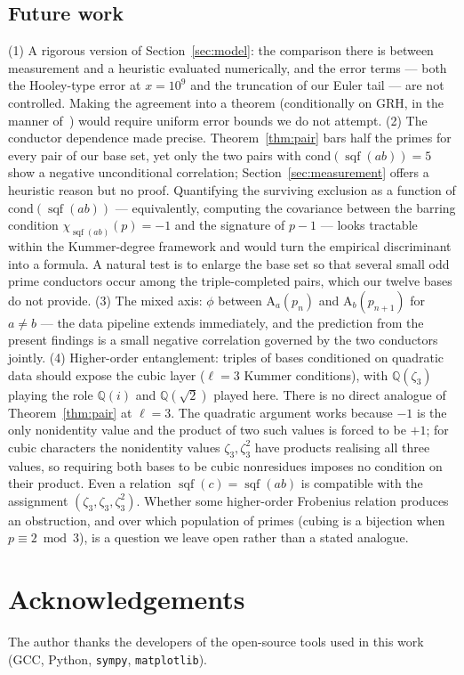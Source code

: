 \documentclass[11pt,reqno]{amsart}
\theoremstyle{plain}
\theoremstyle{definition}
\DeclareMathOperator{\sqf}{sqf}
\newcommand{\Art}{\mathrm{A}}
\newcommand{\Q}{\mathbb{Q}}
\begin{document}
\subsection*{Future work}
(1) A rigorous version of Section~\ref{sec:model}: the comparison there is
between measurement and a heuristic evaluated numerically, and the error terms
--- both the Hooley-type error at $x = 10^9$ and the truncation of our Euler
tail --- are not controlled. Making the agreement into a theorem (conditionally
on GRH, in the manner of~\cite{Matthews1976}) would require uniform error
bounds we do not attempt. (2) The conductor dependence made precise.
Theorem~\ref{thm:pair} bars half the primes for every pair of our base set,
yet only the two pairs with $\mathrm{cond}(\sqf(ab)) = 5$ show a negative
unconditional correlation; Section~\ref{sec:measurement} offers a heuristic reason but no
proof. Quantifying the surviving exclusion as a function of
$\mathrm{cond}(\sqf(ab))$ --- equivalently, computing the covariance between
the barring condition $\chi_{\sqf(ab)}(p) = -1$ and the signature of $p-1$ ---
looks tractable within the Kummer-degree framework and would turn the
empirical discriminant into a formula. A natural test is to enlarge the base
set so that several small odd prime conductors occur among the triple-completed pairs, which our twelve bases do not provide. (3) The mixed axis: $\phi$
between $\Art_a(p_n)$ and $\Art_b(p_{n+1})$ for $a \neq b$ --- the data
pipeline extends immediately, and the prediction from the present findings is a
small negative correlation governed by the two conductors jointly.
(4) Higher-order entanglement: triples of bases conditioned on quadratic data
should expose the cubic layer ($\ell = 3$ Kummer conditions), with
$\Q(\zeta_3)$ playing the role $\Q(i)$ and $\Q(\sqrt{2})$ played here. There is no direct analogue of Theorem~\ref{thm:pair} at $\ell = 3$. The quadratic argument works because $-1$ is the only nonidentity value and the product of two such values is forced to be $+1$; for cubic characters the nonidentity values $\zeta_3, \zeta_3^2$ have products realising all three values, so requiring both bases to be cubic nonresidues imposes no condition on their product. Even a relation $\sqf(c) = \sqf(ab)$ is compatible with the assignment $(\zeta_3, \zeta_3, \zeta_3^2)$. Whether some higher-order Frobenius relation produces an obstruction, and over which population of primes (cubing is a bijection when $p \equiv 2 \bmod 3$), is a question we leave open rather than a stated analogue.

\section*{Acknowledgements}
The author thanks the developers of the open-source tools used in this work
(GCC, Python, \texttt{sympy}, \texttt{matplotlib}).
\end{document}
